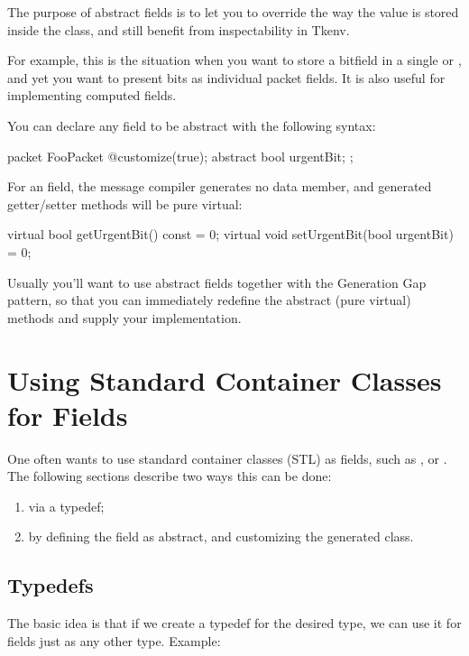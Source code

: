 The purpose of abstract fields is to let you to override
the way the value is stored inside the class,
and still benefit from inspectability in Tkenv.

For example, this is the situation when you want to store a bitfield
in a single  or , and yet you want
to present bits as individual packet fields.
It is also useful for implementing computed fields.

You can declare any field to be abstract with the following syntax:

\begin{msg}
packet FooPacket
{
   @customize(true);
   abstract bool urgentBit;
};
\end{msg}

For an  field, the message compiler generates
no data member, and generated getter/setter methods will be pure
virtual:

\begin{cpp}
virtual bool getUrgentBit() const = 0;
virtual void setUrgentBit(bool urgentBit) = 0;
\end{cpp}


Usually you'll want to use abstract fields together with
the Generation Gap pattern, so that you can immediately
redefine the abstract (pure virtual) methods and
supply your implementation.



\section{Using Standard Container Classes for Fields}
\label{sec:ch-msg-defs:using-stl}

One often wants to use standard container classes (STL) as fields, such as
,  or . The following sections
describe two ways this can be done:

\begin{enumerate}
  \item via a typedef;
  \item by defining the field as abstract, and customizing the generated class.
\end{enumerate}

\subsection{Typedefs}

The basic idea is that if we create a typedef for the desired type,
we can use it for fields just as any other type. Example:

